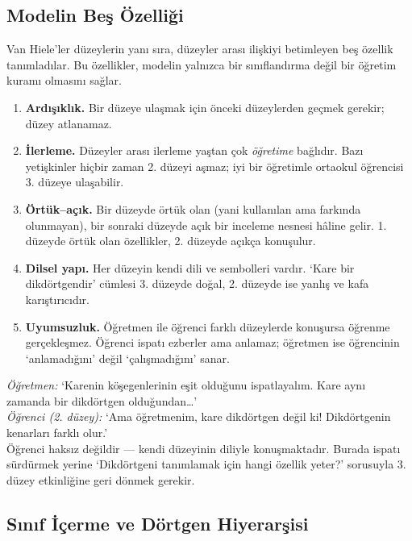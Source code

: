 \subsection{Modelin Beş Özelliği}

Van Hiele’ler düzeylerin yanı sıra, düzeyler arası ilişkiyi betimleyen beş özellik tanımladılar. Bu özellikler, modelin yalnızca bir sınıflandırma değil bir öğretim kuramı olmasını sağlar.

\begin{enumerate}[leftmargin=1.6em,label=\textbf{\arabic*.}]
\item \textbf{Ardışıklık.} Bir düzeye ulaşmak için önceki düzeylerden geçmek gerekir; düzey atlanamaz.
\item \textbf{İlerleme.} Düzeyler arası ilerleme yaştan çok \emph{öğretime} bağlıdır. Bazı yetişkinler hiçbir zaman 2. düzeyi aşmaz; iyi bir öğretimle ortaokul öğrencisi 3. düzeye ulaşabilir.
\item \textbf{Örtük–açık.} Bir düzeyde örtük olan (yani kullanılan ama farkında olunmayan), bir sonraki düzeyde açık bir inceleme nesnesi hâline gelir. 1. düzeyde örtük olan özellikler, 2. düzeyde açıkça konuşulur.
\item \textbf{Dilsel yapı.} Her düzeyin kendi dili ve sembolleri vardır. ‘Kare bir dikdörtgendir’ cümlesi 3. düzeyde doğal, 2. düzeyde ise yanlış ve kafa karıştırıcıdır.
\item \textbf{Uyumsuzluk.} Öğretmen ile öğrenci farklı düzeylerde konuşursa öğrenme gerçekleşmez. Öğrenci ispatı ezberler ama anlamaz; öğretmen ise öğrencinin ‘anlamadığını’ değil ‘çalışmadığını’ sanar.
\end{enumerate}

\begin{yanilgi}
\textit{Öğretmen:} ‘Karenin köşegenlerinin eşit olduğunu ispatlayalım. Kare aynı zamanda bir dikdörtgen olduğundan…’\\
\textit{Öğrenci (2. düzey):} ‘Ama öğretmenim, kare dikdörtgen değil ki! Dikdörtgenin kenarları farklı olur.’\\[2pt]
Öğrenci haksız değildir — kendi düzeyinin diliyle konuşmaktadır. Burada ispatı sürdürmek yerine ‘Dikdörtgeni tanımlamak için hangi özellik yeter?’ sorusuyla 3. düzey etkinliğine geri dönmek gerekir.
\end{yanilgi}

\subsection{Sınıf İçerme ve Dörtgen Hiyerarşisi}

